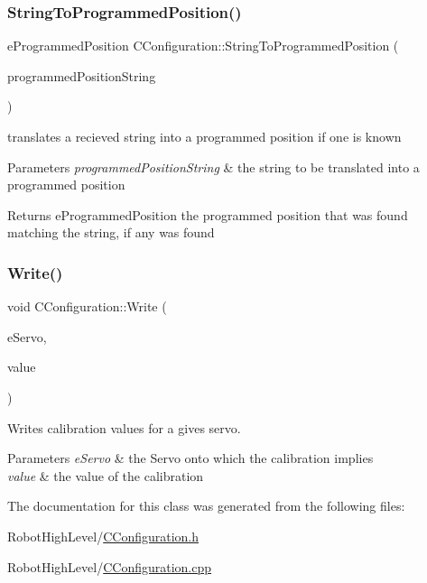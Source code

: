 \subsubsection{\texorpdfstring{String\+To\+Programmed\+Position()}{StringToProgrammedPosition()}}
{\footnotesize\ttfamily e\+Programmed\+Position C\+Configuration\+::\+String\+To\+Programmed\+Position (\begin{DoxyParamCaption}\item[{std\+::string}]{programmed\+Position\+String }\end{DoxyParamCaption})}



translates a recieved string into a programmed position if one is known 


\begin{DoxyParams}{Parameters}
{\em programmed\+Position\+String} & the string to be translated into a programmed position \\
\hline
\end{DoxyParams}
\begin{DoxyReturn}{Returns}
e\+Programmed\+Position the programmed position that was found matching the string, if any was found 
\end{DoxyReturn}
\mbox{\label{classCConfiguration_a3d19b67de92d6035f6d99e61828bb895}} 
\subsubsection{\texorpdfstring{Write()}{Write()}}
{\footnotesize\ttfamily void C\+Configuration\+::\+Write (\begin{DoxyParamCaption}\item[{e\+Servos}]{e\+Servo,  }\item[{uint16\+\_\+t}]{value }\end{DoxyParamCaption})}



Writes calibration values for a gives servo. 


\begin{DoxyParams}{Parameters}
{\em e\+Servo} & the Servo onto which the calibration implies \\
\hline
{\em value} & the value of the calibration \\
\hline
\end{DoxyParams}


The documentation for this class was generated from the following files\+:\begin{DoxyCompactItemize}
\item 
Robot\+High\+Level/\hyperlink{CConfiguration_8h}{C\+Configuration.\+h}\item 
Robot\+High\+Level/\hyperlink{CConfiguration_8cpp}{C\+Configuration.\+cpp}\end{DoxyCompactItemize}
